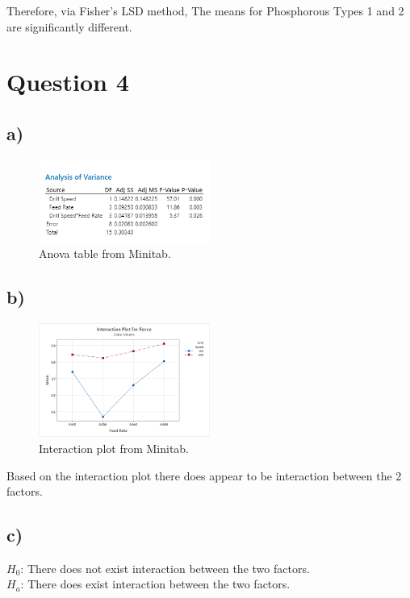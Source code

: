 \documentclass{article}
\begin{document}
Therefore, via Fisher's LSD method, The means for Phosphorous Types 1 and 2 are significantly different.


\clearpage
\section*{Question 4}
\subsection*{a)}
\begin{figure}[h]
    \centering
    \includegraphics[width=0.5\textwidth]{./images/4_a.png}
    \caption{Anova table from Minitab.}
    \label{fig:3_b_2}
\end{figure}

\subsection*{b)}

\begin{figure}[h]
    \centering
    \includegraphics[width=0.5\textwidth]{./images/4_b.png}
    \caption{Interaction plot from Minitab.}
    \label{fig:3_b_2}
\end{figure}

Based on the interaction plot there does appear to be interaction between the 2 factors.

\subsection*{c)}
\begin{flushleft}
    $H_0$: There does not exist interaction between the two factors. \\
    $H_a$: There does exist interaction between the two factors.\\
\end{flushleft}
\end{document}
